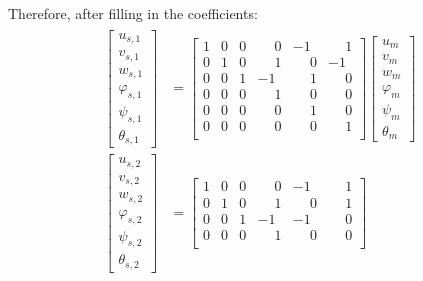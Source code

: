 \documentclass[10pt,b5paper,titlepage]{book}
\newenvironment{eqarray}
{
    \begin{eqnarray}
        \begin{aligned}
}
{
        \end{aligned}
    \end{eqnarray}
}
\begin{document}
Therefore, after filling in the coefficients:
\renewcommand\arraystretch{1.6}
\begin{eqarray}
    \begin{bmatrix}
        u_{s,1} \\
        v_{s,1} \\
        w_{s,1} \\
        \varphi_{s,1} \\
        \psi_{s,1} \\
        \theta_{s,1}
    \end{bmatrix}
    &= \begin{bmatrix}
        1 & 0 & 0 & \phantom{-}0 & -1 & \phantom{-}1 \\
        0 & 1 & 0 & \phantom{-}1 & \phantom{-}0 & -1 \\
        0 & 0 & 1 & -1 & \phantom{-}1 & \phantom{-}0 \\
        0 & 0 & 0 & \phantom{-}1 & \phantom{-}0 & \phantom{-}0 \\
        0 & 0 & 0 & \phantom{-}0 & \phantom{-}1 & \phantom{-}0 \\
        0 & 0 & 0 & \phantom{-}0 & \phantom{-}0 & \phantom{-}1 \\
    \end{bmatrix}
    \begin{bmatrix}
        u_m \\
        v_m \\
        w_m \\
        \varphi_m \\
        \psi_m \\
        \theta_m
    \end{bmatrix} \\
    \begin{bmatrix}
        u_{s,2} \\
        v_{s,2} \\
        w_{s,2} \\
        \varphi_{s,2} \\
        \psi_{s,2} \\
        \theta_{s,2}
    \end{bmatrix}
    &= \begin{bmatrix}
        1 & 0 & 0 & \phantom{-}0 & -1 & \phantom{-}1 \\
        0 & 1 & 0 & \phantom{-}1 & \phantom{-}0 & \phantom{-}1 \\
        0 & 0 & 1 & -1 & -1 & \phantom{-}0 \\
        0 & 0 & 0 & \phantom{-}1 & \phantom{-}0 & \phantom{-}0 \\

\end{bmatrix}
\end{eqarray}
\end{document}
